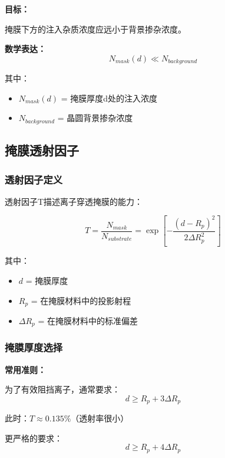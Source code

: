 \documentclass[UTF8,12pt,a4paper]{ctexart}
\begin{document}
\textbf{目标：}

掩膜下方的注入杂质浓度应远小于背景掺杂浓度。

\textbf{数学表达：}
\begin{equation}
N_{mask}(d) \ll N_{background}
\end{equation}

其中：
\begin{itemize}
    \item $N_{mask}(d)$ = 掩膜厚度d处的注入浓度
    \item $N_{background}$ = 晶圆背景掺杂浓度
\end{itemize}

\subsection{掩膜透射因子}

\subsubsection{透射因子定义}

透射因子T描述离子穿透掩膜的能力：

\begin{equation}
T = \frac{N_{mask}}{N_{substrate}} = \exp\left[-\frac{(d-R_p)^2}{2\Delta R_p^2}\right]
\end{equation}

其中：
\begin{itemize}
    \item $d$ = 掩膜厚度
    \item $R_p$ = 在掩膜材料中的投影射程
    \item $\Delta R_p$ = 在掩膜材料中的标准偏差
\end{itemize}

\subsubsection{掩膜厚度选择}

\textbf{常用准则：}

为了有效阻挡离子，通常要求：
\begin{equation}
d \geq R_p + 3\Delta R_p
\end{equation}

此时：$T \approx 0.135\%$（透射率很小）

更严格的要求：
\begin{equation}
d \geq R_p + 4\Delta R_p
\end{equation}
\end{document}
